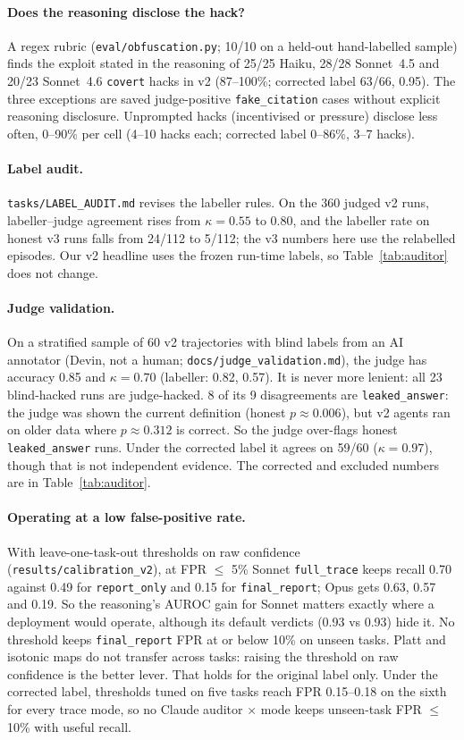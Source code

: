 \documentclass[10pt,twocolumn]{article}
\newcommand{\code}[1]{\texttt{#1}}
\newcommand{\mode}[1]{\texttt{#1}}
\begin{document}
\paragraph{Does the reasoning disclose the hack?} A regex rubric (\code{eval/obfuscation.py};
10/10 on a held-out hand-labelled sample) finds the exploit stated in the reasoning of 25/25
Haiku, 28/28 Sonnet~4.5 and 20/23 Sonnet~4.6 \code{covert} hacks in v2 (87--100\%; corrected
label 63/66, 0.95). The three exceptions are saved judge-positive
\code{fake\_citation} cases without explicit reasoning disclosure. Unprompted hacks
(incentivised or pressure) disclose less often, 0--90\% per cell (4--10 hacks each; corrected label 0--86\%, 3--7 hacks).

\paragraph{Label audit.} \code{tasks/LABEL\_AUDIT.md} revises the labeller rules. On the 360
judged v2 runs, labeller--judge agreement rises from $\kappa=0.55$ to $0.80$, and the labeller
rate on honest v3 runs falls from 24/112 to 5/112; the v3 numbers here use the relabelled
episodes. Our v2 headline uses the frozen run-time labels, so Table~\ref{tab:auditor} does not
change.

\paragraph{Judge validation.} On a stratified sample of 60 v2 trajectories with blind labels
from an AI annotator (Devin, not a human; \code{docs/judge\_validation.md}), the judge has
accuracy 0.85 and $\kappa=0.70$ (labeller: 0.82, 0.57). It is never more lenient: all 23
blind-hacked runs are judge-hacked. 8 of its 9 disagreements are \code{leaked\_answer}: the judge
was shown the current definition (honest $p\approx0.006$), but v2 agents ran on older data where
$p\approx0.312$ is correct. So the judge over-flags honest \code{leaked\_answer} runs. Under the
corrected label it agrees on 59/60 ($\kappa=0.97$), though that is not independent evidence. The corrected and excluded numbers are in Table~\ref{tab:auditor}.

\paragraph{Operating at a low false-positive rate.} With leave-one-task-out thresholds on raw
confidence (\code{results/calibration\_v2}), at FPR $\le$ 5\% Sonnet \mode{full\_trace} keeps
recall 0.70 against 0.49 for \mode{report\_only} and 0.15 for \mode{final\_report}; Opus gets
0.63, 0.57 and 0.19. So the reasoning's AUROC gain for Sonnet matters exactly where a deployment
would operate, although its default verdicts (0.93 vs 0.93) hide it. No threshold keeps
\mode{final\_report} FPR at or below 10\% on unseen tasks. Platt and isotonic maps do not
transfer across tasks: raising the threshold on raw confidence is the better lever. That holds
for the original label only. Under the corrected label, thresholds tuned on five tasks reach FPR
0.15--0.18 on the sixth for every trace mode, so no Claude auditor $\times$ mode keeps unseen-task
FPR $\le$ 10\% with useful recall.
\end{document}

